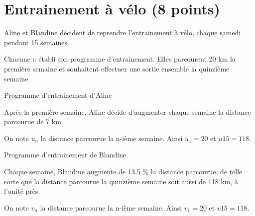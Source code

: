 \section{Entrainement à vélo (8 points)}

Aline et Blandine décident de reprendre l'entrainement à vélo, chaque samedi pendant 15 semaines.

Chacune a établi son programme d'entrainement. Elles parcourent 20 km la première semaine et souhaitent effectuer une sortie ensemble la quinzième semaine.


\begin{questions}
	\question Programme d'entrainement d'Aline
	
		Après la première semaine, Aline décide  d'augmenter chaque semaine la distance parcourue de 7 km.
		
		On note $u_n$ la distance parcourue la n-ième semaine. Ainsi $u_1 = 20$ et $u{15}=118$.
	
		\question Programme d'entrainement de Blandine
		
		Chaque semaine, Blandine augmente de \num{13.5} \% la distance parcourue, de telle sorte que la distance parcourue la quinzième semaine soit aussi de 118 km, à l'unité près.
		
		On note $v_n$ la distance parcourue la n-ième semaine. Ainsi $v_1 = 20$ et $v{15}=118$.
		\begin{parts}

\end{parts}
\end{questions}
